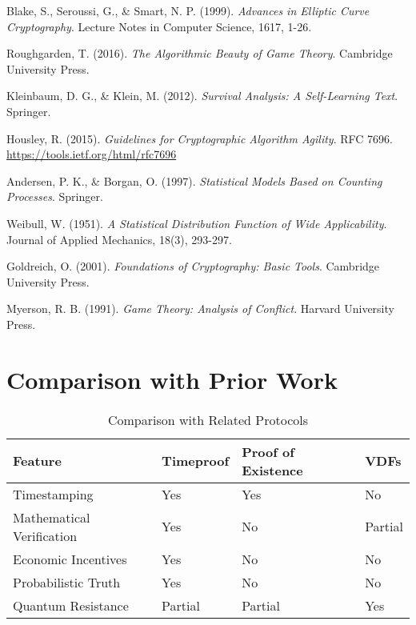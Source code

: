 \documentclass[12pt]{report}
\begin{document}
\begin{thebibliography}{9}
Blake, S., Seroussi, G., \& Smart, N. P. (1999). \textit{Advances in Elliptic Curve Cryptography}. Lecture Notes in Computer Science, 1617, 1-26.

Roughgarden, T. (2016). \textit{The Algorithmic Beauty of Game Theory}. Cambridge University Press.

Kleinbaum, D. G., \& Klein, M. (2012). \textit{Survival Analysis: A Self-Learning Text}. Springer.

Housley, R. (2015). \textit{Guidelines for Cryptographic Algorithm Agility}. RFC 7696. \url{https://tools.ietf.org/html/rfc7696}

Andersen, P. K., \& Borgan, O. (1997). \textit{Statistical Models Based on Counting Processes}. Springer.

Weibull, W. (1951). \textit{A Statistical Distribution Function of Wide Applicability}. Journal of Applied Mechanics, 18(3), 293-297.

Goldreich, O. (2001). \textit{Foundations of Cryptography: Basic Tools}. Cambridge University Press.

Myerson, R. B. (1991). \textit{Game Theory: Analysis of Conflict}. Harvard University Press.

\end{thebibliography}

\section{Comparison with Prior Work}

\begin{table}[h]
\centering
\caption{Comparison with Related Protocols}
\begin{tabular}{|l|l|l|l|}
\hline
\textbf{Feature} & \textbf{Timeproof} & \textbf{Proof of Existence} & \textbf{VDFs} \\
\hline
Timestamping & Yes & Yes & No \\
Mathematical Verification & Yes & No & Partial \\
Economic Incentives & Yes & No & No \\
Probabilistic Truth & Yes & No & No \\
Quantum Resistance & Partial & Partial & Yes \\
\hline
\end{tabular}
\end{table}
\end{document}
